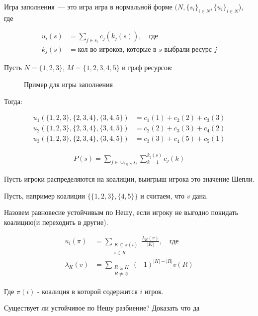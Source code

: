 \begin{df}
	Игра заполнения~--- это игра игра в нормальной форме $(N, \{s_i\}_{i \in N}, \{u_i\}_{i \in N}$), где 

	\begin{align*}
		u_i(s) &= \sum_{j \in s_i} c_j(k_j(s)), \quad \text{где} \\
		k_j(s) &= \text{кол-во игроков, которые в $s$ выбрали ресурс  $j$}
	\end{align*}

\end{df}

\begin{exmpl}
	Пусть $N = \{1, 2, 3\}, \, M = \{1, 2, 3, 4, 5\}$ и граф ресурсов:
\begin{figure}[ht]
    \centering
    \caption{Пример для игры заполнения}
    \label{fig:example-congestion-game}
\end{figure}

Тогда:

\begin{align*}
	u_1(\{1, 2, 3\}, \{2, 3, 4\}, \{3, 4, 5\}) &= c_1(1) + c_2(2) + c_3(3) \\
	u_2(\{1, 2, 3\}, \{2, 3, 4\}, \{3, 4, 5\}) &= c_2(2) + c_3(3) + c_4(2) \\
	u_3(\{1, 2, 3\}, \{2, 3, 4\}, \{3, 4, 5\}) &= c_3(3) + c_4(5) + c_5(1)
\end{align*}

\end{exmpl}

\begin{align*}
	P(s) = \sum_{j \in \cup_{i \in N} s_i} \sum_{k = 1}^{k_j(s)} c_j(k)
\end{align*}

\begin{problem}
	Пусть игроки распределяются на коалиции, выигрыш игрока это значение Шепли.

	Пусть, например коалиции $\{\{1, 2, 3\}, \{4, 5\}\}$ и считаем, что $v$ дана.

	Назовем равновесие устойчивым по Нешу, если игроку не выгодно покидать коалицию(и переходить в другие).

	\begin{align*}
		u_i(\pi) &= \sum_{\substack{K \subseteq \pi(i) \\ i \in K}} \frac{\lambda_K(v)}{|K|}, \quad \text{где} \\
		\lambda_K(v) &= \sum_{\substack{R \subseteq K \\ R \neq \varnothing}} (-1)^{|K| - |R|} v(R)
	\end{align*}

	Где $\pi(i)$ - коалиция в которой содержится  $i$ игрок.

	Существует ли устойчивое по Нешу разбиение? Доказать что да
\end{problem}


